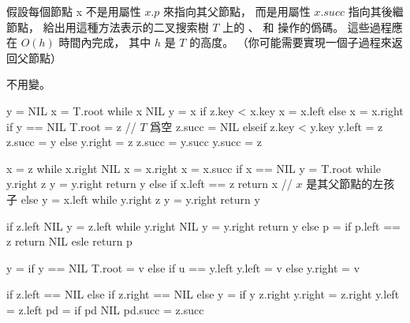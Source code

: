 \startEXERCISE
假設每個節點 x 不是用屬性 $x.p$ 來指向其父節點，
而是用屬性 $x.succ$ 指向其後繼節點，
給出用這種方法表示的二叉搜索樹 $T$ 上的
 、  和  操作的僞碼。
這些過程應在 $O(h)$ 時間內完成，
其中 $h$ 是 $T$ 的高度。
（\hint 你可能需要實現一個子過程來返回父節點）
\stopEXERCISE

\startANSWER
{} 不用變。

\startCLRSCODE
y = NIL
x = T.root
while x \ne NIL
	y = x
	if z.key < x.key
		x = x.left
	else
		x = x.right
if y == NIL
	T.root = z	// $T$ 爲空
	z.succ = NIL
elseif z.key < y.key
	y.left = z
	z.succ = y
else
	y.right = z
	z.succ = y.succ
	y.succ = z
\stopCLRSCODE

\startCLRSCODE
x = z
while x.right \ne NIL
	x = x.right
x = x.succ
if x == NIL
	y = T.root
	while y.right \ne z
		y = y.right
	return y
else
	if x.left == z
		return x	// $x$ 是其父節點的左孩子
	else
		y = x.left
		while y.right \ne z
			y = y.right
		return y
\stopCLRSCODE

\startCLRSCODE
if z.left \ne NIL
	y = z.left
	while y.right \ne NIL
		y = y.right
	return y
else
	p = 
	if p.left == z
		return NIL
	esle
		return p
\stopCLRSCODE

\startCLRSCODE
y = 
if y == NIL
	T.root = v
else if u == y.left
	y.left = v
else
	y.right = v
\stopCLRSCODE

\startCLRSCODE
if z.left == NIL
else if z.right == NIL
else
	y = 
	if y \ne z.right
		y.right = z.right
	y.left = z.left
pd = 
if pd \ne NIL
	pd.succ = z.succ
\stopCLRSCODE
\stopANSWER
